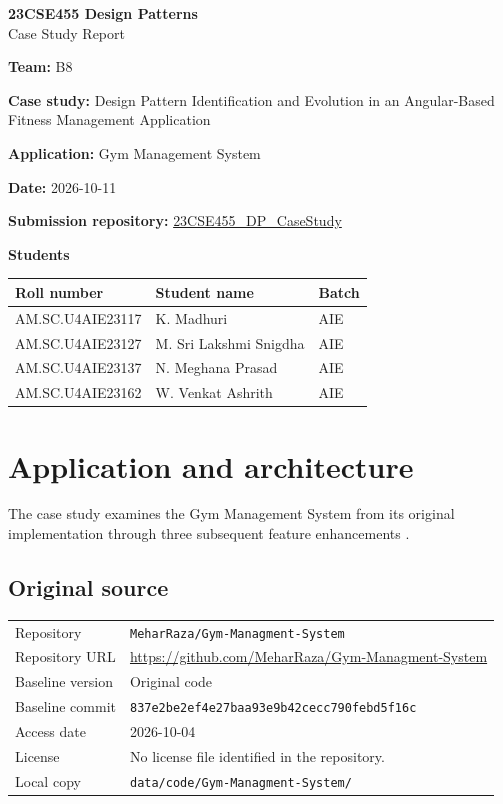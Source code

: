 \documentclass[11pt,a4paper]{article}
\newcommand{\fp}[1]{\nolinkurl{#1}}
\newcommand{\filledentry}[2]{\textbf{#1:} #2\par}
\begin{document}
\begin{center}\Large\textbf{23CSE455 Design Patterns}\\[4pt]\LARGE Case Study Report\end{center}

\filledentry{Team}{B8}
\filledentry{Case study}{Design Pattern Identification and Evolution in an Angular-Based Fitness Management Application}
\filledentry{Application}{Gym Management System}
\filledentry{Date}{2026-10-11}
\textbf{Submission repository:} \href{https://github.com/aswathymohan-amrita/23CSE455_DP_CaseStudy}{23CSE455\_DP\_CaseStudy}\par
\textbf{Students}\par
\begin{tabularx}{\linewidth}{@{}llX@{}}
\toprule
Roll number & Student name & Batch\\
\midrule
AM.SC.U4AIE23117 & K. Madhuri & AIE\\
AM.SC.U4AIE23127 & M. Sri Lakshmi Snigdha & AIE\\
AM.SC.U4AIE23137 & N. Meghana Prasad & AIE\\
AM.SC.U4AIE23162 & W. Venkat Ashrith & AIE\\
\bottomrule
\end{tabularx}

\section{Application and architecture}

The case study examines the Gym Management System from its original implementation through three subsequent feature enhancements .

\subsection{Original source}

\begin{tabularx}{\linewidth}{@{}p{3.4cm}L@{}}
\toprule
Repository & \texttt{MeharRaza/Gym-Managment-System}\\
Repository URL & \url{https://github.com/MeharRaza/Gym-Managment-System}\\
Baseline version & Original code\\
Baseline commit & \texttt{837e2be2ef4e27baa93e9b42cecc790febd5f16c}\\
Access date & 2026-10-04 \\
License & No license file identified in the repository.\\
Local copy & \fp{data/code/Gym-Managment-System/}\\
\bottomrule
\end{tabularx}
\end{document}
